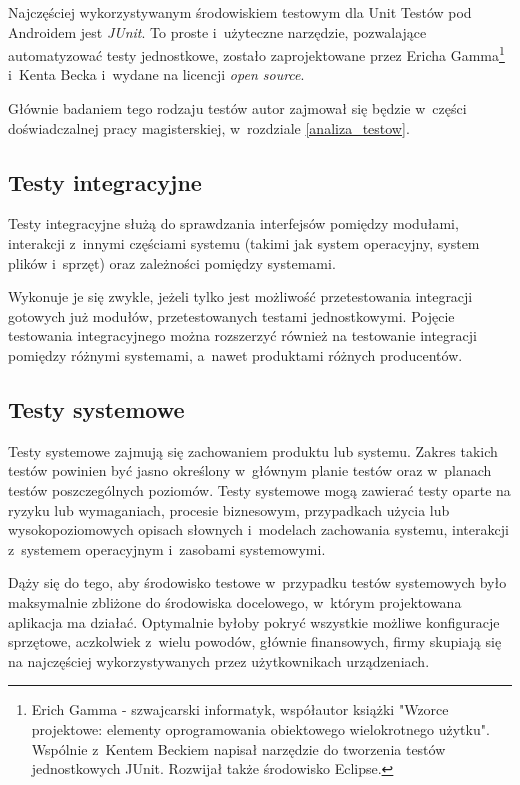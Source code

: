 Najczęściej wykorzystywanym środowiskiem testowym dla Unit Testów pod Androidem jest \textit{JUnit}. To proste i~użyteczne narzędzie, pozwalające automatyzować testy jednostkowe, zostało zaprojektowane przez Ericha Gamma\footnote{Erich Gamma - szwajcarski informatyk, współautor książki "Wzorce projektowe: elementy oprogramowania obiektowego wielokrotnego użytku". Wspólnie z~Kentem Beckiem napisał narzędzie do tworzenia testów jednostkowych JUnit. Rozwijał także środowisko Eclipse.} i~Kenta Becka i~wydane na licencji \textit{open source}\cite{website:opensource}.

Głównie badaniem tego rodzaju testów autor zajmował się będzie w~części doświadczalnej pracy magisterskiej, w~rozdziale \ref{analiza_testow}.

\subsection{Testy integracyjne}

Testy integracyjne służą do sprawdzania interfejsów pomiędzy modułami, interakcji z~innymi częściami systemu (takimi jak system operacyjny, system plików i~sprzęt) oraz zależności pomiędzy systemami.

Wykonuje je się zwykle, jeżeli tylko jest możliwość przetestowania integracji gotowych już modułów, przetestowanych testami jednostkowymi. Pojęcie testowania integracyjnego można rozszerzyć również na testowanie integracji pomiędzy różnymi systemami, a~nawet produktami różnych producentów.\cite{bib:sylabus:foundation}

\subsection{Testy systemowe}

Testy systemowe zajmują się zachowaniem produktu lub systemu. Zakres takich testów powinien być jasno określony w~głównym planie testów oraz w~planach testów poszczególnych poziomów. Testy systemowe mogą zawierać testy oparte na ryzyku lub wymaganiach, procesie biznesowym, przypadkach użycia lub wysokopoziomowych opisach słownych i~modelach zachowania systemu, interakcji z~systemem operacyjnym i~zasobami systemowymi.

Dąży się do tego, aby środowisko testowe w~przypadku testów systemowych było maksymalnie zbliżone do środowiska docelowego, w~którym projektowana aplikacja ma działać. Optymalnie byłoby pokryć wszystkie możliwe konfiguracje sprzętowe, aczkolwiek z~wielu powodów, głównie finansowych, firmy skupiają się na najczęściej wykorzystywanych przez użytkownikach urządzeniach.\cite{bib:sylabus:foundation} 

